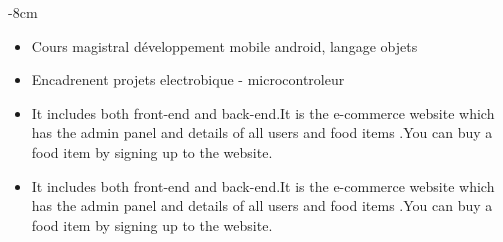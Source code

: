 \documentclass[10pt,a4paper]{altacv}
\begin{document}

\begin{adjustwidth}{}{-8cm}
\makecvheader
\end{adjustwidth}


\begin{itemize}
\item Cours magistral développement mobile android, langage objets
\item Encadrenent projets electrobique - microcontroleur 
\end{itemize}

\divider

\begin{itemize}
\item It includes both front-end and back-end.It is the e-commerce website which has the admin panel and details of all users and food items .You can buy a food item by signing up to the website.
\end{itemize}

\divider

\begin{itemize}
\item It includes both front-end and back-end.It is the e-commerce website which has the admin panel and details of all users and food items .You can buy a food item by signing up to the website.
\end{itemize}
\end{document}
